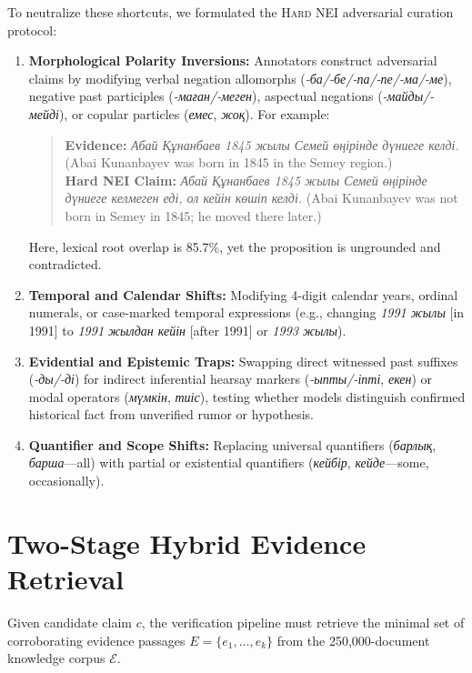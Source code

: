 To neutralize these shortcuts, we formulated the \textsc{Hard NEI} adversarial curation protocol:
\begin{enumerate}
    \item \textbf{Morphological Polarity Inversions:} Annotators construct adversarial claims by modifying verbal negation allomorphs (\textit{-ба/-бе/-па/-пе/-ма/-ме}), negative past participles (\textit{-маған/-меген}), aspectual negations (\textit{-майды/-мейді}), or copular particles (\textit{емес}, \textit{жоқ}). For example:
    \begin{quote}
    \textbf{Evidence:} \textit{Абай Құнанбаев 1845 жылы Семей өңірінде дүниеге келді.} (Abai Kunanbayev was born in 1845 in the Semey region.) \\
    \textbf{Hard NEI Claim:} \textit{Абай Құнанбаев 1845 жылы Семей өңірінде дүниеге келмеген еді, ол кейін көшіп келді.} (Abai Kunanbayev was not born in Semey in 1845; he moved there later.)
    \end{quote}
    Here, lexical root overlap is 85.7\%, yet the proposition is ungrounded and contradicted.
    
    \item \textbf{Temporal and Calendar Shifts:} Modifying 4-digit calendar years, ordinal numerals, or case-marked temporal expressions (e.g., changing \textit{1991 жылы} [in 1991] to \textit{1991 жылдан кейін} [after 1991] or \textit{1993 жылы}).
    
    \item \textbf{Evidential and Epistemic Traps:} Swapping direct witnessed past suffixes (\textit{-ды/-ді}) for indirect inferential hearsay markers (\textit{-ыпты/-іпті}, \textit{екен}) or modal operators (\textit{мүмкін}, \textit{тиіс}), testing whether models distinguish confirmed historical fact from unverified rumor or hypothesis.
    
    \item \textbf{Quantifier and Scope Shifts:} Replacing universal quantifiers (\textit{барлық}, \textit{барша}---all) with partial or existential quantifiers (\textit{кейбір}, \textit{кейде}---some, occasionally).
\end{enumerate}

\section{Two-Stage Hybrid Evidence Retrieval}
\label{sec:hybrid_retrieval}

Given candidate claim $c$, the verification pipeline must retrieve the minimal set of corroborating evidence passages $E = \{e_1, \dots, e_k\}$ from the 250,000-document knowledge corpus $\mathcal{E}$.

